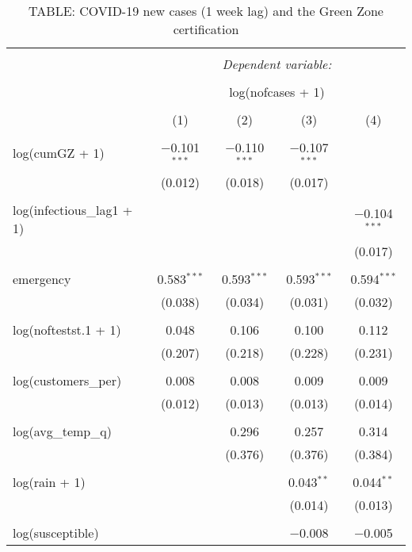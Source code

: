 
\begin{table}[!htbp] \centering 
  \caption{TABLE: COVID-19 new cases (1 week lag) and the Green Zone certification} 
  \label{} 
\begin{tabular}{@{\extracolsep{5pt}}lcccc} 
\\[-1.8ex]\hline 
\hline \\[-1.8ex] 
 & \multicolumn{4}{c}{\textit{Dependent variable:}} \\ 
\cline{2-5} 
\\[-1.8ex] & \multicolumn{4}{c}{log(nofcases + 1)} \\ 
\\[-1.8ex] & (1) & (2) & (3) & (4)\\ 
\hline \\[-1.8ex] 
 log(cumGZ + 1) & $-$0.101$^{***}$ & $-$0.110$^{***}$ & $-$0.107$^{***}$ &  \\ 
  & (0.012) & (0.018) & (0.017) &  \\ 
  & & & & \\ 
 log(infectious\_lag1 + 1) &  &  &  & $-$0.104$^{***}$ \\ 
  &  &  &  & (0.017) \\ 
  & & & & \\ 
 emergency & 0.583$^{***}$ & 0.593$^{***}$ & 0.593$^{***}$ & 0.594$^{***}$ \\ 
  & (0.038) & (0.034) & (0.031) & (0.032) \\ 
  & & & & \\ 
 log(noftestst.1 + 1) & 0.048 & 0.106 & 0.100 & 0.112 \\ 
  & (0.207) & (0.218) & (0.228) & (0.231) \\ 
  & & & & \\ 
 log(customers\_per) & 0.008 & 0.008 & 0.009 & 0.009 \\ 
  & (0.012) & (0.013) & (0.013) & (0.014) \\ 
  & & & & \\ 
 log(avg\_temp\_q) &  & 0.296 & 0.257 & 0.314 \\ 
  &  & (0.376) & (0.376) & (0.384) \\ 
  & & & & \\ 
 log(rain + 1) &  &  & 0.043$^{**}$ & 0.044$^{**}$ \\ 
  &  &  & (0.014) & (0.013) \\ 
  & & & & \\ 
 log(susceptible) &  &  & $-$0.008 & $-$0.005 \\ 

\end{tabular}
\end{table}
